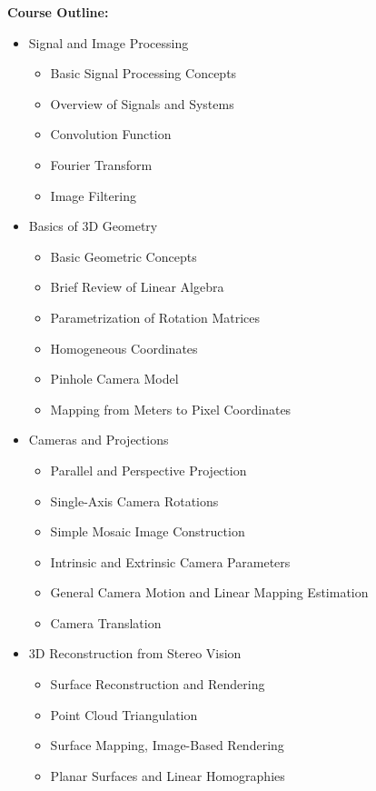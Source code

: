 \documentclass[12pt]{article}
\begin{document}
\textbf{Course Outline:}
\begin{itemize}
    \item Signal and Image Processing
    \begin{itemize}
        \item Basic Signal Processing Concepts
        \item Overview of Signals and Systems
        \item Convolution Function
        \item Fourier Transform
        \item Image Filtering
    \end{itemize}
    
    \item Basics of 3D Geometry
    \begin{itemize}
        \item Basic Geometric Concepts
        \item Brief Review of Linear Algebra
        \item Parametrization of Rotation Matrices
        \item Homogeneous Coordinates
        \item Pinhole Camera Model
        \item Mapping from Meters to Pixel Coordinates
    \end{itemize}
    
    \item Cameras and Projections
    \begin{itemize}
        \item Parallel and Perspective Projection
        \item Single-Axis Camera Rotations
        \item Simple Mosaic Image Construction
        \item Intrinsic and Extrinsic Camera Parameters
        \item General Camera Motion and Linear Mapping Estimation
        \item Camera Translation
    \end{itemize}
    
    \item 3D Reconstruction from Stereo Vision
    \begin{itemize}
        \item Surface Reconstruction and Rendering
        \item Point Cloud Triangulation
        \item Surface Mapping, Image-Based Rendering
        \item Planar Surfaces and Linear Homographies
    \end{itemize}
    

\end{itemize}
\end{document}
